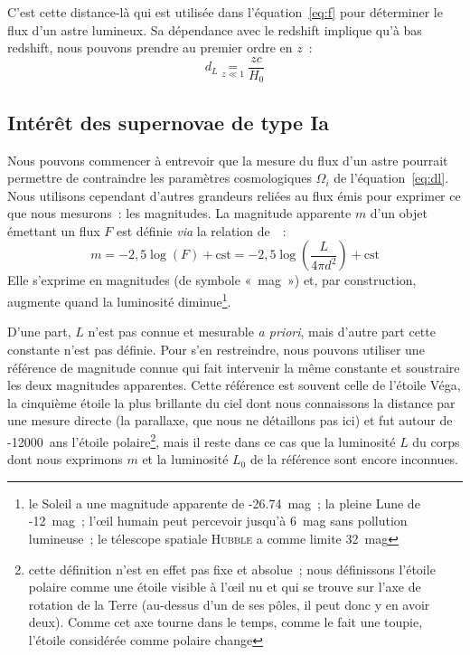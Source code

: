 \documentclass[../main/main.tex]{subfiles}
\begin{document}
C'est cette distance-là qui est utilisée dans l'équation~\ref{eq:f} pour
déterminer le flux d'un astre lumineux. Sa dépendance avec le redshift
implique qu'à bas redshift, nous pouvons prendre au premier ordre en $z$~:
\begin{equation}\label{eq:dlz0}
    d_L \underset{z \ll 1}{=} \frac{zc}{H_0}
\end{equation}

\subsection{Intérêt des supernovae de type Ia}\label{ssec:intsne}

Nous pouvons commencer à entrevoir que la mesure du flux d'un astre pourrait
permettre de contraindre les paramètres cosmologiques $\Omega_i$ de
l'équation~\ref{eq:dl}. Nous utilisons cependant d'autres grandeurs reliées au
flux émis pour exprimer ce que nous mesurons~: les magnitudes. La magnitude
apparente $m$ d'un objet émettant un flux $F$ est définie \textit{via} la
relation de~\cite{pogson1856}~:
\begin{equation}\label{eq:m}
    m = -2,5\log \left(F\right) + \text{cst} =
    -2,5\log \left( \frac{L}{4\pi d^2} \right) + \text{cst}
\end{equation}
Elle s'exprime en magnitudes (de symbole «~mag~») et, par construction, augmente
quand la luminosité diminue\footnote{le Soleil a une magnitude apparente de
    -\SI{26.74}{mag}~; la pleine Lune de -\SI{12}{mag}~; l'œil humain peut
    percevoir jusqu'à \SI{6}{mag} sans pollution lumineuse~; le télescope
spatiale \textsc{Hubble} a comme limite \SI{32}{mag}}.

D'une part, $L$ n'est pas connue et mesurable \textit{a priori}, mais d'autre
part cette constante n'est pas définie. Pour s'en restreindre, nous pouvons
utiliser une référence de magnitude connue qui fait intervenir la même constante
et soustraire les deux magnitudes apparentes. Cette référence est souvent celle
de l'étoile Véga, la cinquième étoile la plus brillante du ciel dont nous
connaissons la distance par une mesure directe (la parallaxe, que nous ne
détaillons pas ici) et fut autour de -\SI{12000}{ans} l'étoile
polaire\footnote{cette définition n'est en effet pas fixe et absolue~; nous
    définissons l'étoile polaire comme une étoile visible à l'œil nu et qui se
    trouve sur l'axe de rotation de la Terre (au-dessus d'un de ses pôles, il
    peut donc y en avoir deux). Comme cet axe tourne dans le temps, comme le
    fait une
toupie, l'étoile considérée comme polaire change}, mais il reste dans ce cas que
la luminosité $L$ du corps dont nous exprimons $m$ et la luminosité $L_0$ de la
référence sont encore inconnues.
\end{document}
